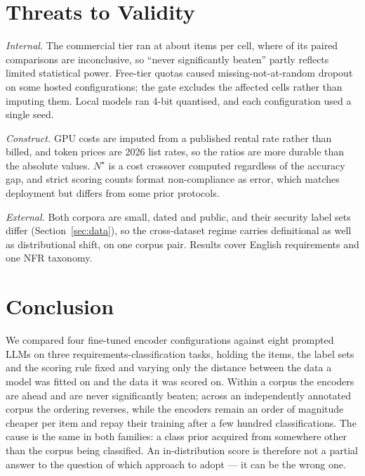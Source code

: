 \documentclass[conference]{IEEEtran}
\begin{document}
\section{Threats to Validity}
\label{sec:threats}
\emph{Internal.} The commercial tier ran at about \nNGemini{} items per cell,
where \nTieGemini{} of its \nNtestGemini{} paired comparisons are inconclusive,
so ``never significantly beaten'' partly reflects limited statistical power.
Free-tier quotas caused missing-not-at-random dropout on some hosted
configurations; the gate excludes the affected cells rather than imputing them.
Local models ran 4-bit quantised, and each configuration used a single seed.

\emph{Construct.} GPU costs are imputed from a published rental rate rather than
billed, and token prices are 2026 list rates, so the ratios are more durable than
the absolute values. $N^{\star}$ is a cost crossover computed regardless of the
accuracy gap, and strict scoring counts format non-compliance as error, which
matches deployment but differs from some prior protocols.

\emph{External.} Both corpora are small, dated and public, and their security
label sets differ (Section~\ref{sec:data}), so the cross-dataset regime carries
definitional as well as distributional shift, on one corpus pair. Results cover
English requirements and one NFR taxonomy.

\section{Conclusion}
We compared four fine-tuned encoder configurations against eight prompted LLMs on
three requirements-classification tasks, holding the items, the label sets and
the scoring rule fixed and varying only the distance between the data a model was
fitted on and the data it was scored on. Within a corpus the encoders are ahead
and are never significantly beaten; across an independently annotated corpus the
ordering reverses, while the encoders remain an order of magnitude cheaper per
item and repay their training after a few hundred classifications. The cause is
the same in both families: a class prior acquired from somewhere other than the
corpus being classified. An in-distribution score is therefore not a partial
answer to the question of which approach to adopt --- it can be the wrong one.
\end{document}

